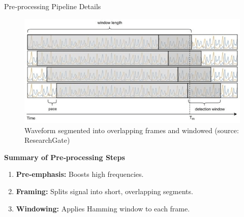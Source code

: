 \begin{frame}[allowframebreaks]{Pre‑processing Pipeline Details}
    \begin{figure}[h]
        \centering
        \includegraphics[width=\textwidth]{images/audio-nlp/waveform-segment.png}
        \caption*{Waveform segmented into overlapping frames and windowed (source: ResearchGate)}
    \end{figure}

    \framebreak

    \textbf{Summary of Pre‑processing Steps}
    \begin{enumerate}
        \item \textbf{Pre‑emphasis:} Boosts high frequencies.
        \item \textbf{Framing:} Splits signal into short, overlapping segments.
        \item \textbf{Windowing:} Applies Hamming window to each frame.
    \end{enumerate}
\end{frame}